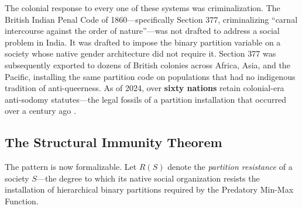 \documentclass[12pt,openany]{book}
\begin{document}
The colonial response to every one of these systems was criminalization. The British Indian Penal Code of 1860---specifically Section 377, criminalizing ``carnal intercourse against the order of nature''---was not drafted to address a social problem in India. It was drafted to impose the binary partition variable on a society whose native gender architecture did not require it. Section 377 was subsequently exported to dozens of British colonies across Africa, Asia, and the Pacific, installing the same partition code on populations that had no indigenous tradition of anti-queerness. As of 2024, over \textbf{sixty nations} retain colonial-era anti-sodomy statutes---the legal fossils of a partition installation that occurred over a century ago \cite{hrw_alien_legacy}.

\subsection{The Structural Immunity Theorem}

The pattern is now formalizable. Let $R(S)$ denote the \textit{partition resistance} of a society $S$---the degree to which its native social organization resists the installation of hierarchical binary partitions required by the Predatory Min-Max Function.
\end{document}
